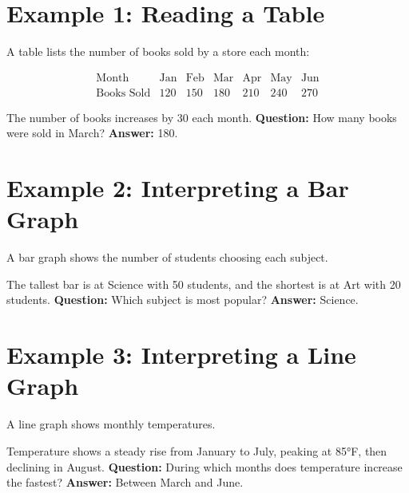 \documentclass[14pt]{extarticle}
\begin{document}
\section*{Example 1: Reading a Table}

A table lists the number of books sold by a store each month:

\[
\begin{array}{c|cccccc}
\text{Month} & \text{Jan} & \text{Feb} & \text{Mar} & \text{Apr} & \text{May} & \text{Jun}\\ \hline
\text{Books Sold} & 120 & 150 & 180 & 210 & 240 & 270
\end{array}
\]

The number of books increases by 30 each month.  
\textbf{Question:} How many books were sold in March?  
\textbf{Answer:} 180.

\section*{Example 2: Interpreting a Bar Graph}

A bar graph shows the number of students choosing each subject.


The tallest bar is at Science with 50 students, and the shortest is at Art with 20 students.
\textbf{Question:} Which subject is most popular?
\textbf{Answer:} Science.

\section*{Example 3: Interpreting a Line Graph}

A line graph shows monthly temperatures.


Temperature shows a steady rise from January to July, peaking at 85°F, then declining in August.
\textbf{Question:} During which months does temperature increase the fastest?
\textbf{Answer:} Between March and June.
\end{document}
